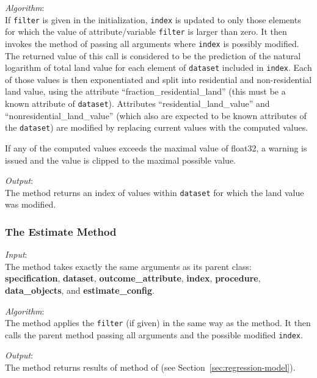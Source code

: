 {\it Algorithm}:\\[1mm]
If \verb|filter| is given in the initialization, \verb|index| is
updated to only those elements for which the value of
attribute/variable \verb|filter| is
larger than zero. It then invokes the  method of
 passing all arguments where
\verb|index| is possibly modified. The returned value of this call
is considered to be the prediction of the natural logarithm of total
land value for each element of \verb|dataset| included in
\verb|index|. Each of those values is then exponentiated and split
into residential and non-residential land value, using the attribute
``fraction_residential_land'' (this must be a known
attribute of \verb|dataset|). 
Attributes ``residential_land_value'' and
``nonresidential_land_value'' (which also are expected to be known
attributes of the \verb|dataset|) are modified by
replacing current values with the computed values.

If any of the computed values exceeds the maximal value of float32, a warning
is issued and the value is clipped to the maximal possible value.

{\it Output}:\\[1mm]
The method returns an index of values within \verb|dataset| for which the land
value was modified.

\subsubsection{The Estimate Method}
{\it Input}:\\[1mm]
The  method takes exactly the same arguments as its parent
class: \\
{\bf specification}, {\bf dataset}, {\bf outcome_attribute}, {\bf index}, {\bf
  procedure}, {\bf data_objects}, and {\bf estimate_config}.

{\it Algorithm}:\\[1mm]
The method applies the \verb|filter| (if given) in the same way as the
 method. It then calls the parent method 
passing all arguments and the possible modified \verb|index|.

{\it Output}:\\[1mm]
The method returns results of  method of
 (see Section~\ref{sec:regression-model}).

